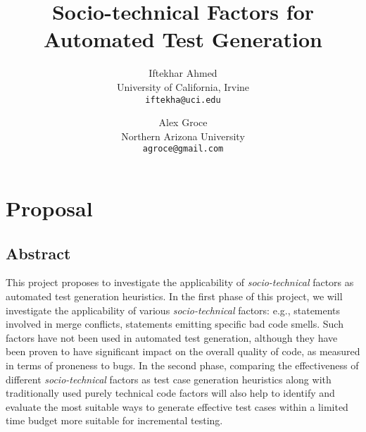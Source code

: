 \documentclass[10pt]{article}
\title{Socio-technical Factors for Automated Test Generation \vspace{-2ex}}
\author{
  Iftekhar Ahmed\\
  University of California, Irvine\\
  \texttt{iftekha@uci.edu} \vspace{-5ex}
  \and
  Alex Groce\\
  Northern Arizona University\\
  \texttt{agroce@gmail.com}\vspace{-5ex}
}
\date{}
\begin{document}
\maketitle

\section{Proposal}

\subsection{Abstract}

This project proposes to investigate the applicability of \emph{socio-technical} factors as automated test generation heuristics. In the first phase of this project, we will investigate the applicability of various \emph{socio-technical} factors: e.g., statements involved in merge conflicts, statements emitting specific bad code smells.   Such factors have not been used in automated test generation, although they have been proven to have significant impact on the overall quality of code, as measured in terms of proneness to bugs. In the second phase, comparing the effectiveness of different \emph{socio-technical} factors as test case generation heuristics along with traditionally used purely technical code factors will also help to identify and evaluate the most suitable ways to generate effective test cases within a limited time budget more suitable for incremental testing.
\end{document}
